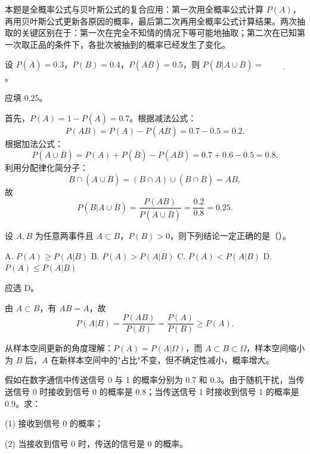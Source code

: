 \documentclass[lang=cn,11pt]{elegantbook}
\begin{document}
\begin{note}
本题是全概率公式与贝叶斯公式的复合应用：第一次用全概率公式计算 \(P(A)\)，再用贝叶斯公式更新各原因的概率，最后第二次再用全概率公式计算结果。两次抽取的关键区别在于：第一次在完全不知情的情况下等可能地抽取；第二次在已知第一次取正品的条件下，各批次被抽到的概率已经发生了变化。
\end{note}

\begin{exercise}\label{exer:1-21}
设 \(P(\overline{A}) = 0.3\)，\(P(B) = 0.4\)，\(P(A\overline{B}) = 0.5\)，则 \(P(B|A\cup\overline{B}) = \underline{\hspace{2cm}}\)。
\end{exercise}

\begin{solution}
应填 \(0.25\)。

首先，\(P(A) = 1 - P(\overline{A}) = 0.7\)。根据减法公式：
\[P(AB) = P(A) - P(A\overline{B}) = 0.7 - 0.5 = 0.2.\]
根据加法公式：
\[P(A\cup\overline{B}) = P(A) + P(\overline{B}) - P(A\overline{B}) = 0.7 + 0.6 - 0.5 = 0.8.\]
利用分配律化简分子：
\[B \cap (A\cup\overline{B}) = (B\cap A)\cup(B\cap\overline{B}) = AB,\]
故
\[P(B|A\cup\overline{B}) = \frac{P(AB)}{P(A\cup\overline{B})} = \frac{0.2}{0.8} = 0.25.\]
\end{solution}

\begin{exercise}\label{exer:1-22}
设 \(A, B\) 为任意两事件且 \(A\subset B\)，\(P(B) > 0\)，则下列结论一定正确的是（\quad）。\par
A. \(P(A) \ge P(A|B)\)\quad
B. \(P(A) > P(A|B)\)\quad
C. \(P(A) < P(A|B)\)\quad
D. \(P(A) \le P(A|B)\)
\end{exercise}

\begin{solution}
应选 D。

由 \(A\subset B\)，有 \(AB = A\)，故
\[P(A|B) = \frac{P(AB)}{P(B)} = \frac{P(A)}{P(B)} \ge P(A).\]

从样本空间更新的角度理解：\(P(A) = P(A|\Omega)\)，而 \(A\subset B\subset\Omega\)，样本空间缩小为 \(B\) 后，\(A\) 在新样本空间中的"占比"不变，但不确定性减小，概率增大。
\end{solution}

\begin{exercise}\label{exer:1-23}
假如在数字通信中传送信号 0 与 1 的概率分别为 0.7 和 0.3。由于随机干扰，当传送信号 0 时接收到信号 0 的概率是 0.8；当传送信号 1 时接收到信号 1 的概率是 0.9。求：\par
(1) 接收到信号 0 的概率；\par
(2) 当接收到信号 0 时，传送的信号是 0 的概率。
\end{exercise}
\end{document}

